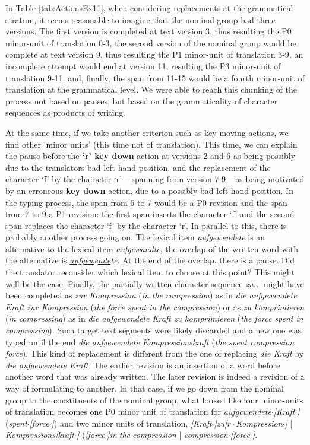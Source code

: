 In Table \ref{tab:ActionsEx11}, when considering replacements at the grammatical stratum, it seems reasonable to imagine that the nominal group had three versions. The first version is completed at text version 3, thus resulting the P0 minor-unit of translation 0-3, the second version of the nominal group would be complete at text version 9, thus resulting the P1 minor-unit of translation 3-9, an incomplete attempt would end at version 11, resulting the P3 minor-unit of translation 9-11, and, finally, the span from 11-15 would be a fourth minor-unit of translation at the grammatical level. We were able to reach this chunking of the process not based on pauses, but based on the grammaticality of character sequences as products of writing.

At the same time, if we take another criterion such as key-moving actions, we find other `minor units' (this time not of translation). This time, we can explain the pause before the \textbf{`r' key down} action at versions 2 and 6 as being possibly due to the translators bad left hand position, and the replacement of the character `f' by the character `r' -- spanning from version 7-9 -- as being motivated by an erroneous \textbf{key down} action, due to a possibly bad left hand position. In the typing process, the span from 6 to 7 would be a P0 revision and the span from 7 to 9 a P1 revision: the first span inserts the character `f' and the second span replaces the character `f' by the character `r'. In parallel to this, there is probably another process going on. The lexical item \emph{aufgewendete} is an alternative to the lexical item \emph{aufgewandte}, the overlap of the written word with the alternative is \emph{\underline{aufgew}e\underline{nde}te}. At the end of the overlap, there is a pause. Did the translator reconsider which lexical item to choose at this point? This might well be the case. Finally, the partially written character sequence \emph{zu...} might have been completed as \emph{zur Kompression} (\emph{in the compression}) as in \emph{die aufgewendete Kraft zur Kompression} (\emph{the force spent in the compression}) or as \emph{zu komprimieren} (\emph{in compressing}) as in \emph{die aufgewendete Kraft zu komprimieren} (\emph{the force spent in compressing}). Such target text segments were likely discarded and a new one was typed until the end \emph{die aufgewendete Kompressionskraft} (\emph{the spent compression force}). This kind of replacement is different from the one of replacing \emph{die Kraft} by \emph{die aufgewendete Kraft}. The earlier revision is an insertion of a word before another word that was already written. The later revision is indeed a revision of a way of formulating to another. In that case, if we go down from the nominal group to the constituents of the nominal group, what looked like four minor-units of translation becomes one P0 minor unit of translation for \emph{aufgewendete$\cdot${[}Kraft$\cdot${]}} (\emph{spent$\cdot${[}force$\cdot${]}}) and two minor units of translation, \emph{{[}Kraft$\cdot${]}zu{[}$r\cdot$Kompression$\cdot${]}} | \emph{Kompressions{[}kraft$\cdot${]}} (\emph{{[}force$\cdot${]}in$\cdot$the$\cdot$compression} | \emph{compression$\cdot${[}force$\cdot${]}}.

